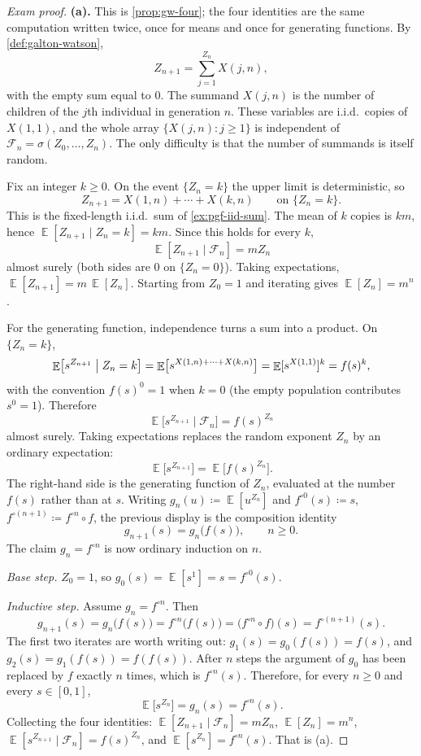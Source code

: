 \documentclass[11pt,a4paper]{article}
\DeclareMathOperator{\E}{\mathbb{E}}
\begin{document}
\begin{proof}[Exam proof]
\textbf{(a).}
This is \cref{prop:gw-four}; the four identities are the same computation written twice, once for means and once for generating functions. By \cref{def:galton-watson},
\[
Z_{n+1}
=
\sum_{j=1}^{Z_n} X(j,n),
\]
with the empty sum equal to \(0\). The summand \(X(j,n)\) is the number of children of the \(j\)th individual in generation \(n\). These variables are i.i.d.\ copies of \(X(1,1)\), and the whole array \(\{X(j,n): j\ge 1\}\) is independent of \(\mathcal{F}_n=\sigma(Z_0,\dots,Z_n)\). The only difficulty is that the number of summands is itself random.

Fix an integer \(k\ge 0\). On the event \(\{Z_n=k\}\) the upper limit is deterministic, so
\[
Z_{n+1}
=
X(1,n)+\cdots+X(k,n)
\qquad\text{on }\{Z_n=k\}.
\]
This is the fixed-length i.i.d.\ sum of \cref{ex:pgf-iid-sum}. The mean of \(k\) copies is \(km\), hence \(\E[Z_{n+1}\mid Z_n=k]=km\). Since this holds for every \(k\),
\[
\E[Z_{n+1}\mid\mathcal{F}_n]
=
m Z_n
\]
almost surely (both sides are \(0\) on \(\{Z_n=0\}\)). Taking expectations, \(\E[Z_{n+1}]=m\,\E[Z_n]\). Starting from \(Z_0=1\) and iterating gives \(\E[Z_n]=m^n\).

For the generating function, independence turns a sum into a product. On \(\{Z_n=k\}\),
\[
\E\bigl[s^{Z_{n+1}}\bigm|Z_n=k\bigr]
=
\E\bigl[s^{X(1,n)+\cdots+X(k,n)}\bigr]
=
\E[s^{X(1,1)}]^k
=
f(s)^k,
\]
with the convention \(f(s)^0=1\) when \(k=0\) (the empty population contributes \(s^0=1\)). Therefore
\[
\E\bigl[s^{Z_{n+1}}\mid\mathcal{F}_n\bigr]
=
f(s)^{Z_n}
\]
almost surely. Taking expectations replaces the random exponent \(Z_n\) by an ordinary expectation:
\[
\E\bigl[s^{Z_{n+1}}\bigr]
=
\E\bigl[f(s)^{Z_n}\bigr].
\]
The right-hand side is the generating function of \(Z_n\), evaluated at the number \(f(s)\) rather than at \(s\). Writing \(g_n(u)\coloneqq\E[u^{Z_n}]\) and \(f^{\circ 0}(s)\coloneqq s\), \(f^{\circ (n+1)}\coloneqq f^{\circ n}\circ f\), the previous display is the composition identity
\[
g_{n+1}(s)
=
g_n\bigl(f(s)\bigr),
\qquad n\ge 0.
\]
The claim \(g_n=f^{\circ n}\) is now ordinary induction on \(n\).

\emph{Base step.} \(Z_0=1\), so \(g_0(s)=\E[s^1]=s=f^{\circ 0}(s)\).

\emph{Inductive step.} Assume \(g_n=f^{\circ n}\). Then
\[
g_{n+1}(s)
=
g_n\bigl(f(s)\bigr)
=
f^{\circ n}\bigl(f(s)\bigr)
=
\bigl(f^{\circ n}\circ f\bigr)(s)
=
f^{\circ(n+1)}(s).
\]
The first two iterates are worth writing out: \(g_1(s)=g_0(f(s))=f(s)\), and \(g_2(s)=g_1(f(s))=f(f(s))\). After \(n\) steps the argument of \(g_0\) has been replaced by \(f\) exactly \(n\) times, which is \(f^{\circ n}(s)\). Therefore, for every \(n\ge 0\) and every \(s\in[0,1]\),
\[
\E\bigl[s^{Z_n}\bigr]
=
g_n(s)
=
f^{\circ n}(s).
\]
Collecting the four identities: \(\E[Z_{n+1}\mid\mathcal{F}_n]=mZ_n\), \(\E[Z_n]=m^n\), \(\E[s^{Z_{n+1}}\mid\mathcal{F}_n]=f(s)^{Z_n}\), and \(\E[s^{Z_n}]=f^{\circ n}(s)\). That is (a).


\end{proof}
\end{document}
